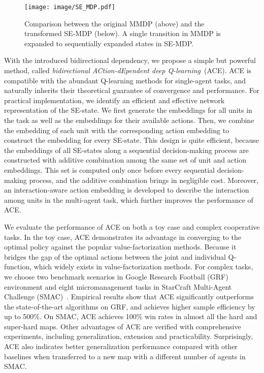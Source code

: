 \documentclass[letterpaper]{article} \usepackage{aaai23}  \usepackage{times}  \usepackage{helvet}  \usepackage{courier}  \usepackage[hyphens]{url}  \usepackage{graphicx} \urlstyle{rm} \def\UrlFont{\rm}  \usepackage{natbib}  \usepackage{caption} \frenchspacing  \setlength{\pdfpagewidth}{8.5in} \setlength{\pdfpageheight}{11in} \usepackage{algorithm}
\begin{document}
\begin{figure*}[t]
    \centering
    \texttt{[image: image/SE\_MDP.pdf]}
\vspace{-3ex}
    \caption{Comparison between the original MMDP (above) and the transformed SE-MDP (below). A single transition in MMDP is expanded to  sequentially expanded states in SE-MDP.}
\vspace{-3ex}
    \label{fig:mdp}
\end{figure*}

With the introduced bidirectional dependency, we propose a simple but powerful method, called \textit{bidirectional ACtion-dEpendent deep Q-learning}~(ACE). ACE is compatible with the abundant Q-learning methods for single-agent tasks, and naturally inherits their theoretical guarantee of convergence and performance. For practical implementation, we identify an efficient and effective network representation of the SE-state. 
We first generate the embeddings for all units in the task as well as the embeddings for their available actions. 
Then, we combine the embedding of each unit with the corresponding action embedding to construct the embedding for every SE-state. 
This design is quite efficient, because the embeddings of all SE-states along a sequential decision-making process are constructed with additive combination among the same set of unit and action embeddings. This set is computed only once before every sequential decision-making process, and the additive combination brings in negligible cost. 
Moreover, an interaction-aware action embedding is developed to describe the interaction among units in the multi-agent task, which further improves the performance of ACE.

We evaluate the performance of ACE on both a toy case and complex cooperative tasks. In the toy case, ACE demonstrates its advantage in converging to the optimal policy against the popular value-factorization methods. Because it bridges the gap of the optimal actions between the joint and individual Q-function, which widely exists in value-factorization methods. For complex tasks, we choose two benchmark scenarios in Google Research Football (GRF)~\citeyear{grf} environment and eight micromanagement tasks in StarCraft Multi-Agent Challenge (SMAC)~\citeyear{smac}. Empirical results show that ACE significantly outperforms the state-of-the-art algorithms on GRF, and achieves higher sample efficiency by up to 500\%. On SMAC, ACE achieves 100\% win rates in almost all the hard and super-hard maps. Other advantages of ACE are verified with comprehensive experiments, including generalization, extension and practicability. Surprisingly, ACE also indicates better generalization performance compared with other baselines when transferred to a new map with a different number of agents in SMAC.
\end{document}
